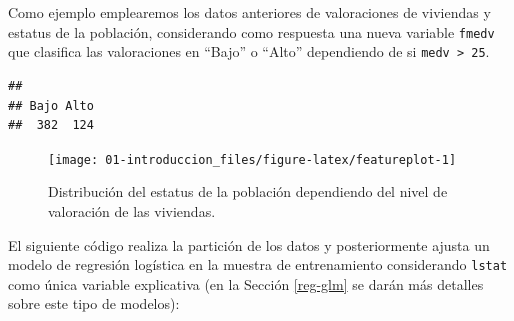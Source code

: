 \documentclass[
  spanish,
]{book}
\newenvironment{Shaded}{\begin{snugshade}}{\end{snugshade}}
\newcommand{\CommentTok}[1]{\textcolor[rgb]{0.56,0.35,0.01}{\textit{#1}}}
\newcommand{\DataTypeTok}[1]{\textcolor[rgb]{0.13,0.29,0.53}{#1}}
\newcommand{\DecValTok}[1]{\textcolor[rgb]{0.00,0.00,0.81}{#1}}
\newcommand{\KeywordTok}[1]{\textcolor[rgb]{0.13,0.29,0.53}{\textbf{#1}}}
\newcommand{\NormalTok}[1]{#1}
\newcommand{\OperatorTok}[1]{\textcolor[rgb]{0.81,0.36,0.00}{\textbf{#1}}}
\newcommand{\OtherTok}[1]{\textcolor[rgb]{0.56,0.35,0.01}{#1}}
\newcommand{\StringTok}[1]{\textcolor[rgb]{0.31,0.60,0.02}{#1}}
\theoremstyle{break}
\theoremstyle{definition}
\theoremstyle{definition}
\theoremstyle{definition}
\theoremstyle{remark}
\begin{document}
Como ejemplo emplearemos los datos anteriores de valoraciones de viviendas y estatus de la población, considerando como respuesta una nueva variable \texttt{fmedv} que clasifica las valoraciones en ``Bajo'' o ``Alto'' dependiendo de si \texttt{medv\ \textgreater{}\ 25}.

\begin{Shaded}
\end{Shaded}

\begin{verbatim}
## 
## Bajo Alto 
##  382  124
\end{verbatim}

\begin{Shaded}
\end{Shaded}

\begin{figure}[!htb]

{\centering \texttt{[image: 01-introduccion\_files/figure-latex/featureplot-1]} 

}

\caption{Distribución del estatus de la población dependiendo del nivel de valoración de las viviendas.}\label{fig:featureplot}
\end{figure}

El siguiente código realiza la partición de los datos y posteriormente ajusta un modelo de regresión logística en la muestra de entrenamiento considerando \texttt{lstat} como única variable explicativa (en la Sección \ref{reg-glm} se darán más detalles sobre este tipo de modelos):
\end{document}
